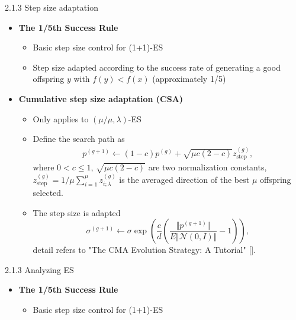 \documentclass{beamer}
\begin{document}
\begin{frame}{2.1.3 Step size adaptation}
\begin{itemize}
    \item \textbf{The 1/5th Success Rule} 
    \begin{itemize}
        \item Basic step size control for (1+1)-ES 
        \item Step size adapted according to the success rate  of generating a good offspring $y$ with $f(y)<f(x)$ (approximately 1/5)
    \end{itemize}

    \item \textbf{Cumulative step size adaptation (CSA)}
    \begin{itemize}
        \item Only applies to $(\mu/\mu,\lambda)$-ES
        \item Define the search path as 
        \begin{align}
        p^{(g+1)} \leftarrow (1-c)p^{(g)} + \sqrt{\mu c (2-c)} z_{\text{step}}^{(g)},\nonumber 
        \end{align}
        where $0<c \leq 1$, $ \sqrt{\mu c (2-c)}$ are two normalization constants, $z_{\text{step}}^{(g)} = 
        1/\mu \sum_{i=1}^\mu z_{i;\lambda}^{(g)}$ is the averaged direction of the best $\mu$ offspring selected.
        \item The step size is adapted 
            $$\sigma^{(g+1)} \leftarrow \sigma \exp \left (  \frac{c}{d}  \left( \frac{\Vert p^{(g+1)}\Vert}{E \Vert \mathcal{N}(0,I)\Vert } -1 \right) \right ),$$
            detail refers to "The CMA Evolution Strategy: A Tutorial" []. 
    \end{itemize}

\end{itemize}
\end{frame}

\begin{frame}{2.1.3 Analyzing ES}
\begin{itemize}
    \item \textbf{The 1/5th Success Rule} 
    \begin{itemize}
        \item Basic step size control for (1+1)-ES 
        
    \end{itemize}

\end{itemize}
\end{frame}
\end{document}
